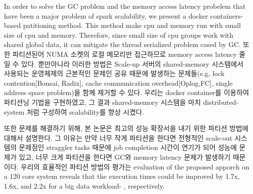\fi


\ifkor
In order to solve the GC problem and the memory access latency probelem
that have been a major problem of spark scalability, we present a docker
containers-based patitioning method.
This method make cpu and memory run with small size of cpu and memory.
Therefore, since small size of cpu groups work with shared global data, it can
mitigate the thread serialized problem cased by GC.
또한 파티션된어 NUMA 소켓의 로컬 메모리만 접근하므로 memory access latency 줄일 수 있다. 
뿐만아니라 이러한 방법은 Scale-up 서버의 shared-memory 시스템에서 사용되는
운영체제의 근본적인 문제인 공유 때문에 발생하는
문제들(e.g, lock contention[Bonsai, Radix], cache communication overhead[Oplog,FC], single address space problem)을
함께 제거할 수 있다. 
우리는 docker container를 이용하여 파티션닝 기법을 구현하였고, 그 결과 shared-memory 시스템을 마치
distributed-system 처럼 구성하여 scalability를 향상 시켰다.
\else


\fi



\ifkor
또한 문제를 해결하기 위해, 본 논문은 최고의 성능 확장서을 내기 위한 파티션 방법에 대해서 설명한다. 
그 이유는 만약 너무 작게 파티션을 한다면 전형적인 scale-out 시스템의 문제점인 straggler tasks 때문에 
job completion 시간이 연기가 되어 성능에 문제가 있고, 너무 크게 파티션을 한다면 GC와 
memory latency 문제가 발생하기 때문이다.  
우리의 효율적인 파티션 방법의 평가는 evaluation of the proposed apporch on a 120 core system
reveals that the execution times could be improved by 1.7x, 1.6x, and 2.2x for 
a big data workload- , respectively.
\else


